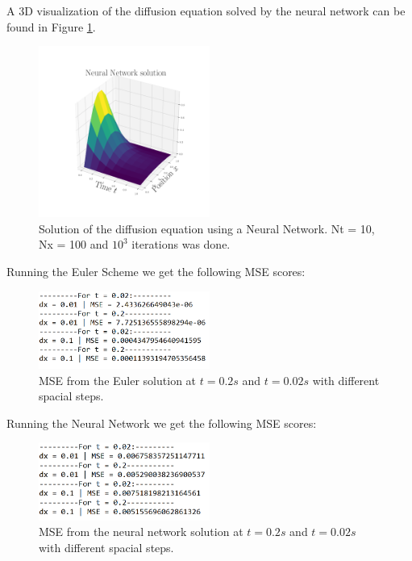 \documentclass[a4paper,11pt,twocolumn]{article}
\begin{document}
A 3D visualization of the diffusion equation solved by the neural network can be found in Figure \ref{3dnn}.

\begin{figure}[h]
	\centering 
	\includegraphics[width=0.5\textwidth]{figures/dnn}
	\caption{Solution of the diffusion equation using a Neural Network. Nt = 10, Nx = 100 and $10^3$ iterations was done. }
	\label{3dnn}
\end{figure}

Running the Euler Scheme we get the following MSE scores:

\begin{figure}[h]
	\centering 
	\includegraphics[width=0.5\textwidth]{figures/euler_mse}
	\caption{MSE from the Euler solution at $t = 0.2s$ and $t = 0.02s$ with different spacial steps.}
	\label{eulermse}
\end{figure}

Running the Neural Network we get the following MSE scores:

\begin{figure}[h]
	\centering 
	\includegraphics[width=0.5\textwidth]{figures/nnn_mse}
	\caption{MSE from the neural network solution at $t = 0.2s$ and $t = 0.02s$ with different spacial steps.}
	\label{nnmse}
\end{figure}
\end{document}
